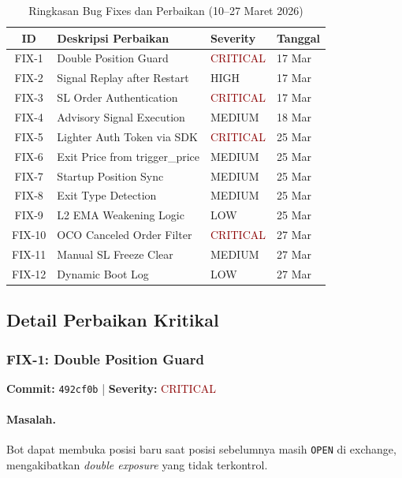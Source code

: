 \documentclass[10pt,a4paper]{article}
\begin{document}
\begin{table}[ht]
\caption{Ringkasan Bug Fixes dan Perbaikan (10--27 Maret 2026)}
\label{tab:fix_summary}
\centering
\small
\begin{tabular}{clll}
\toprule
\textbf{ID} & \textbf{Deskripsi Perbaikan} & \textbf{Severity} & \textbf{Tanggal} \\
\midrule
FIX-1  & Double Position Guard          & \textcolor{darkred}{CRITICAL} & 17 Mar \\
FIX-2  & Signal Replay after Restart    & HIGH                          & 17 Mar \\
FIX-3  & SL Order Authentication        & \textcolor{darkred}{CRITICAL} & 17 Mar \\
FIX-4  & Advisory Signal Execution      & MEDIUM                        & 18 Mar \\
FIX-5  & Lighter Auth Token via SDK     & \textcolor{darkred}{CRITICAL} & 25 Mar \\
FIX-6  & Exit Price from trigger\_price & MEDIUM                        & 25 Mar \\
FIX-7  & Startup Position Sync          & MEDIUM                        & 25 Mar \\
FIX-8  & Exit Type Detection            & MEDIUM                        & 25 Mar \\
FIX-9  & L2 EMA Weakening Logic         & LOW                           & 25 Mar \\
FIX-10 & OCO Canceled Order Filter      & \textcolor{darkred}{CRITICAL} & 27 Mar \\
FIX-11 & Manual SL Freeze Clear         & MEDIUM                        & 27 Mar \\
FIX-12 & Dynamic Boot Log               & LOW                           & 27 Mar \\
\bottomrule
\end{tabular}
\end{table}

\subsection{Detail Perbaikan Kritikal}

\subsubsection{FIX-1: Double Position Guard}
\textbf{Commit:} \texttt{492cf0b} | \textbf{Severity:} \textcolor{darkred}{CRITICAL}

\paragraph{Masalah.} Bot dapat membuka posisi baru saat posisi sebelumnya masih \texttt{OPEN} di exchange, mengakibatkan \textit{double exposure} yang tidak terkontrol.
\end{document}
